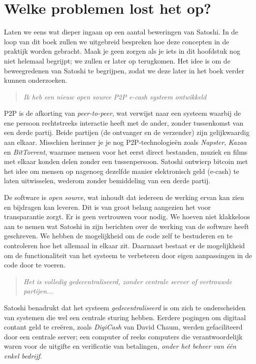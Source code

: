 \section{Welke problemen lost het op?}

Laten we eens wat dieper ingaan op een aantal beweringen van Satoshi. In de loop van dit boek zullen we uitgebreid bespreken hoe deze concepten in de praktijk worden gebracht. Maak je geen zorgen als je iets in dit hoofdstuk nog niet helemaal begrijpt; we zullen er later op terugkomen. Het idee is om de beweegredenen van Satoshi te begrijpen, zodat we deze later in het boek verder kunnen onderzoeken.

\begin{quote}
\textit{Ik heb een nieuw open source P2P e-cash systeem ontwikkeld}
\end{quote}

P2P is de afkorting van \textit{peer-to-peer}, wat verwijst naar een systeem waarbij de ene persoon rechtstreeks interactie heeft met de ander, zonder tussenkomst van een derde partij. Beide partijen (de ontvanger en de verzender) zijn gelijkwaardig aan elkaar. Misschien herinner je je nog P2P-technologieën zoals \textit{Napster}, \textit{Kazaa} en \textit{BitTorrent}, waarmee mensen voor het eerst direct bestanden, muziek en films met elkaar konden delen zonder een tussenpersoon. Satoshi ontwierp bitcoin met het idee om mensen op nagenoeg dezelfde manier elektronisch geld (e-cash) te laten uitwisselen, wederom zonder bemiddeling van een derde partij.

De software is \textit{open source}, wat inhoudt dat iedereen de werking ervan kan zien en bijdragen kan leveren. Dit is van groot belang aangezien het voor transparantie zorgt. Er is geen vertrouwen voor nodig. We hoeven niet klakkeloos aan te nemen wat Satoshi in zijn berichten over de werking van de software heeft geschreven. We hebben de mogelijkheid om de code zelf te bestuderen en te controleren hoe het allemaal in elkaar zit. Daarnaast bestaat er de mogelijkheid om de functionaliteit van het systeem te verbeteren door eigen aanpassingen in de code door te voeren.

\begin{quote}
\textit{Het is volledig gedecentraliseerd, zonder centrale server of vertrouwde partijen...}
\end{quote}

Satoshi benadrukt dat het systeem \textit{gedecentraliseerd} is om zich te onderscheiden van systemen die wel een centrale sturing hebben. Eerdere pogingen om digitaal contant geld te creëren, zoals \textit{DigiCash} van David Chaum, werden gefaciliteerd door een centrale server; een computer of reeks computers die verantwoordelijk waren voor de uitgifte en verificatie van betalingen, \textit{onder het beheer van één enkel bedrijf}.

